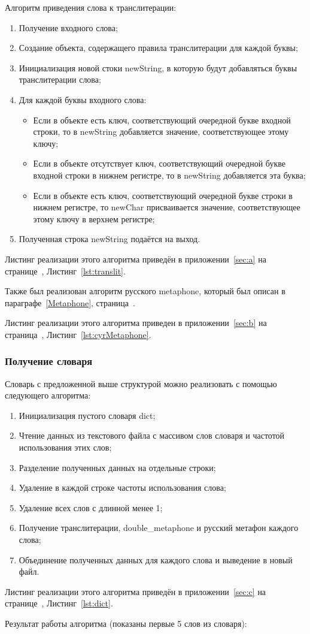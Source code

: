Алгоритм приведения слова к транслитерации:

\begin{enumerate}
  \item Получение входного слова;
  \item Создание объекта, содержащего правила транслитерации для каждой буквы;
  \item Инициализация новой стоки newString, в которую будут добавляться буквы транслитерации слова;
  \item Для каждой буквы входного слова:
   \begin{itemize}
    \item Если в объекте есть ключ, соответствующий очередной букве входной строки, то в newString добавляется значение, соответствующее этому ключу;
    \item Если в объекте отсутствует ключ, соответствующий очередной букве входной строки в нижнем регистре, то в newString добавляется эта буква;
    \item Если в объекте есть ключ, соответствующий очередной букве строки в нижнем регистре, то newChar присваивается значение, соответствующее этому ключу в верхнем регистре;
  \end{itemize}
  \item Полученная строка newString подаётся на выход.
\end{enumerate}

Листинг реализации этого алгоритма приведён в приложении~\ref{sec:a} на странице~\pageref{lst:translit}, Листинг~\ref{lst:translit}.

Также был реализован алгоритм русского metaphone, который был описан в параграфе~\ref{Metaphone}, страница~\pageref{Metaphone}.

Листинг реализации этого алгоритма приведен в приложении~\ref{sec:b} на страница~\pageref{lst:cyrMetaphone}, Листинг~\ref{lst:cyrMetaphone}.

\subsubsection{Получение словаря}

Словарь с предложенной выше структурой можно реализовать с помощью следующего алгоритма:

\begin{enumerate}
  \item Инициализация пустого словаря dict;
  \item Чтение данных из текстового файла с массивом слов словаря и частотой использования этих слов;
  \item Разделение полученных данных на отдельные строки;
  \item Удаление в каждой строке частоты использования слова;
  \item Удаление всех слов с длинной менее 1;
  \item Получение транслитерации, double\_metaphone и русский метафон каждого слова;
  \item Объединение полученных данных для каждого слова и выведение в новый файл.
\end{enumerate}

Листинг реализации этого алгоритма приведён в приложении~\ref{sec:c} на странице~\pageref{lst:dict}, Листинг~\ref{lst:dict}.

Результат работы алгоритма (показаны первые 5 слов из словаря):

